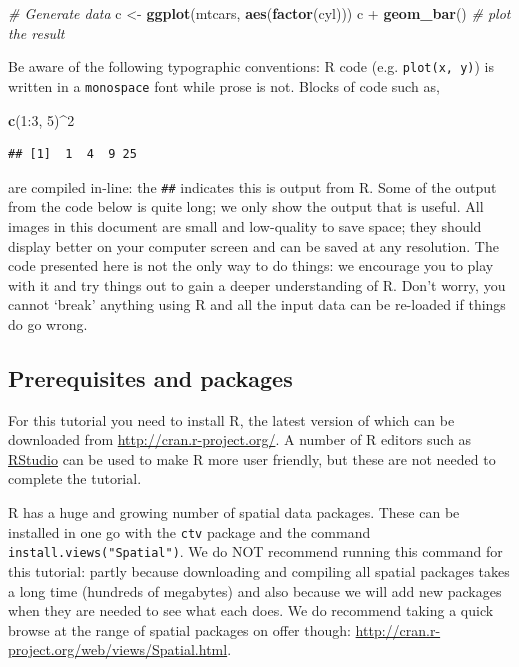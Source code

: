 \documentclass[]{article}
\newenvironment{Shaded}{}{}
\newcommand{\KeywordTok}[1]{\textcolor[rgb]{0.00,0.44,0.13}{\textbf{{#1}}}}
\newcommand{\DecValTok}[1]{\textcolor[rgb]{0.25,0.63,0.44}{{#1}}}
\newcommand{\CommentTok}[1]{\textcolor[rgb]{0.38,0.63,0.69}{\textit{{#1}}}}
\newcommand{\NormalTok}[1]{{#1}}
\begin{document}
\begin{Shaded}
\begin{Highlighting}[]
\CommentTok{# Generate data}
\NormalTok{c <- }\KeywordTok{ggplot}\NormalTok{(mtcars, }\KeywordTok{aes}\NormalTok{(}\KeywordTok{factor}\NormalTok{(cyl)))}
\NormalTok{c + }\KeywordTok{geom_bar}\NormalTok{()  }\CommentTok{# plot the result}
\end{Highlighting}
\end{Shaded}
Be aware of the following typographic conventions: R code (e.g.
\texttt{plot(x, y)}) is written in a \texttt{monospace} font while prose
is not. Blocks of code such as,

\begin{Shaded}
\begin{Highlighting}[]
\KeywordTok{c}\NormalTok{(}\DecValTok{1}\NormalTok{:}\DecValTok{3}\NormalTok{, }\DecValTok{5}\NormalTok{)^}\DecValTok{2}
\end{Highlighting}
\end{Shaded}
\begin{verbatim}
## [1]  1  4  9 25
\end{verbatim}
are compiled in-line: the \texttt{\#\#} indicates this is output from R.
Some of the output from the code below is quite long; we only show the
output that is useful. All images in this document are small and
low-quality to save space; they should display better on your computer
screen and can be saved at any resolution. The code presented here is
not the only way to do things: we encourage you to play with it and try
things out to gain a deeper understanding of R. Don't worry, you cannot
`break' anything using R and all the input data can be re-loaded if
things do go wrong.

\subsection{Prerequisites and packages}

For this tutorial you need to install R, the latest version of which can
be downloaded from
\href{http://cran.r-project.org/}{http://cran.r-project.org/}. A number
of R editors such as \href{http://www.rstudio.com/}{RStudio} can be used
to make R more user friendly, but these are not needed to complete the
tutorial.

R has a huge and growing number of spatial data packages. These can be
installed in one go with the \texttt{ctv} package and the command
\texttt{install.views("Spatial")}. We do NOT recommend running this
command for this tutorial: partly because downloading and compiling all
spatial packages takes a long time (hundreds of megabytes) and also
because we will add new packages when they are needed to see what each
does. We do recommend taking a quick browse at the range of spatial
packages on offer though:
\href{http://cran.r-project.org/web/views/Spatial.html}{http://cran.r-project.org/web/views/Spatial.html}.
\end{document}
